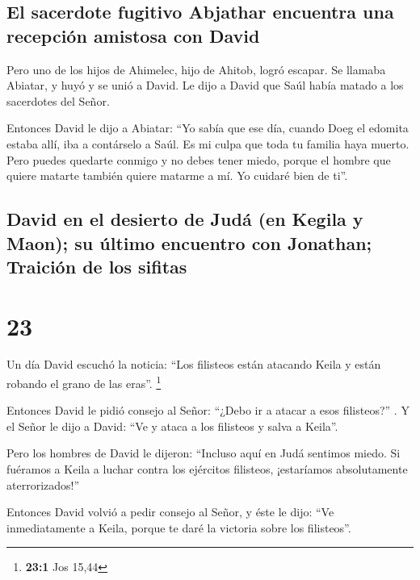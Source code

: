\hypertarget{el-sacerdote-fugitivo-abjathar-encuentra-una-recepciuxf3n-amistosa-con-david}{%
\subsection{El sacerdote fugitivo Abjathar encuentra una recepción
amistosa con
David}\label{el-sacerdote-fugitivo-abjathar-encuentra-una-recepciuxf3n-amistosa-con-david}}

 Pero uno de los hijos de Ahimelec, hijo de Ahitob, logró
escapar. Se llamaba Abiatar, y huyó y se unió a David. 
Le dijo a David que Saúl había matado a los sacerdotes del Señor.

 Entonces David le dijo a Abiatar: ``Yo sabía que ese
día, cuando Doeg el edomita estaba allí, iba a contárselo a Saúl. Es mi
culpa que toda tu familia haya muerto.  Pero puedes
quedarte conmigo y no debes tener miedo, porque el hombre que quiere
matarte también quiere matarme a mí. Yo cuidaré bien de ti''.

\hypertarget{david-en-el-desierto-de-juduxe1-en-kegila-y-maon-su-uxfaltimo-encuentro-con-jonathan-traiciuxf3n-de-los-sifitas}{%
\subsection{David en el desierto de Judá (en Kegila y Maon); su último
encuentro con Jonathan; Traición de los
sifitas}\label{david-en-el-desierto-de-juduxe1-en-kegila-y-maon-su-uxfaltimo-encuentro-con-jonathan-traiciuxf3n-de-los-sifitas}}

\hypertarget{section-22}{%
\section{23}\label{section-22}}

 Un día David escuchó la noticia: ``Los filisteos están
atacando Keila y están robando el grano de las eras''. \footnote{\textbf{23:1}
  Jos 15,44}

 Entonces David le pidió consejo al Señor: ``¿Debo ir a
atacar a esos filisteos?'' . Y el Señor le dijo a David: ``Ve y ataca a
los filisteos y salva a Keila''.

 Pero los hombres de David le dijeron: ``Incluso aquí en
Judá sentimos miedo. Si fuéramos a Keila a luchar contra los ejércitos
filisteos, ¡estaríamos absolutamente aterrorizados!''

 Entonces David volvió a pedir consejo al Señor, y éste le
dijo: ``Ve inmediatamente a Keila, porque te daré la victoria sobre los
filisteos''.

